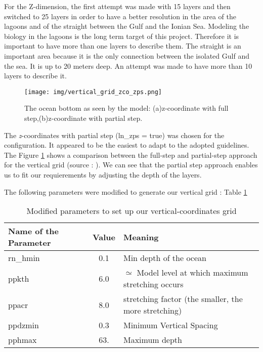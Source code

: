 \documentclass[english]{PFeENSTA}
\begin{document}
{\begin{figure}[H]
\end{figure}

For the Z-dimension, the first attempt was made with 15 layers and then switched to 25 layers in order to have a better resolution in the area of the lagoons and of the straight between the Gulf and the Ionian Sea. Modeling the biology in the lagoons is the long term target of this project. Therefore it is important to have more than one layers to describe them. The straight is an important area because it is the only connection between the isolated Gulf and the sea. It is up to 20 meters deep. An attempt was made to have more than 10 layers to describe it.

\begin{figure}[!h]
\centering
\texttt{[image: img/vertical\_grid\_zco\_zps.png]}
\caption{\label{fig:verticalGrid}The ocean bottom as seen by the model: (a)z-coordinate with full step,(b)z-coordinate with partial step.}
\end{figure}


The \textit{z}-coordinates with partial step (ln\_zps = true) was chosen for the configuration. It appeared to be the easiest to adapt to the adopted guidelines. The Figure \ref{fig:verticalGrid} shows a comparison between the full-step and partial-step approach for the vertical grid (source : \cite{Madec_Bk08}). We can see that the partial step approach enables us to fit our requierements by adjusting the depth of the layers.


The following parameters were  modified to generate our vertical grid : Table \ref{Zparam}
\begin{table}[!h]
\begin{center}
  \begin{tabular}{| l | c | l| }
    \hline
     Name of the Parameter & Value & Meaning \\ \hline
    rn\_hmin & 0.1 & Min depth of the ocean \\ \hline
    ppkth  & 6.0 &	$	\simeq$ Model level at which maximum stretching occurs \\ \hline
    ppacr & 8.0 & stretching factor (the smaller, the more stretching) \\ \hline
    ppdzmin  & 0.3 &	Minimum Vertical Spacing \\ \hline
    pphmax  & 63. &	Maximum depth \\         
    \hline
  \end{tabular}
\caption{Modified parameters to set up our vertical-coordinates grid}
\label{Zparam}
\end{center}
\end{table}

}
\end{document}
